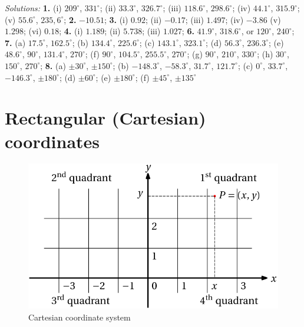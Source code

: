 \documentclass[
  12pt,
  oneside]{book}
\theoremstyle{definition}
\theoremstyle{definition}
\theoremstyle{definition}
\theoremstyle{definition}
\theoremstyle{remark}
\begin{document}
\emph{Solutions:}
\textbf{1.} (i) \(209^\circ\), \(331^\circ\);
(ii) \(33.3^\circ\), \(326.7^\circ\);
(iii) \(118.6^\circ\), \(298.6^\circ\);
(iv) \(44.1^\circ\), \(315.9^\circ\);
(v) \(55.6^\circ\), \(235,6^\circ\);
\textbf{2.} \(-10.51\);
\textbf{3.} (i) \(0.92\);
(ii) \(-0.17\);
(iii) \(1.497\);
(iv) \(-3.86\)
(v) \(1.298\);
(vi) \(0.18\);
\textbf{4.} (i) \(1.189\);
(ii) \(5.738\);
(iii) \(1.027\);
\textbf{6.} \(41.9^\circ\), \(318.6^\circ\), or \(120^\circ\), \(240^\circ\);
\textbf{7.} (a) \(17.5^\circ\), \(162.5^\circ\);
(b) \(134.4^\circ\), \(225.6^\circ\);
(c) \(143.1^\circ\), \(323.1^\circ\);
(d) \(56.3^\circ\), \(236.3^\circ\);
(e) \(48.6^\circ\), \(90^\circ\), \(131.4^\circ\), \(270^\circ\);
(f) \(90^\circ\), \(104.5^\circ\), \(255.5^\circ\), \(270^\circ\);
(g) \(90^\circ\), \(210^\circ\), \(330^\circ\);
(h) \(30^\circ\), \(150^\circ\), \(270^\circ\);
\textbf{8.}
(a) \(\pm 30^\circ\), \(\pm150^\circ\);
(b) \(-148.3^\circ\), \(-58.3^\circ\), \(31.7^\circ\), \(121.7^\circ\);
(c) \(0^\circ\), \(33.7^\circ\), \(-146.3^\circ\), \(\pm180^\circ\);
(d) \(\pm 60^\circ\);
(e) \(\pm180^\circ\);
(f) \(\pm45^\circ\), \(\pm135^\circ\)

\hypertarget{rectangular-cartesian-coordinates}{%
\chapter{Rectangular (Cartesian) coordinates}\label{rectangular-cartesian-coordinates}}

\begin{figure}

{\centering \includegraphics{t16-cart} 

}

\caption{Cartesian coordinate system}\label{fig:unnamed-chunk-66}
\end{figure}
\end{document}
